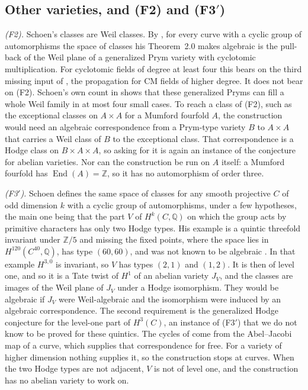 \documentclass[11pt]{amsart}
\theoremstyle{definition}
\theoremstyle{remark}
\newcommand{\QQ}{\mathbb{Q}}
\newcommand{\ZZ}{\mathbb{Z}}
\newcommand{\End}{\operatorname{End}}
\begin{document}
\subsection{Other varieties, and \texorpdfstring{(F2) and (F3$'$)}{(F2) and (F3')}}

\emph{(F2).} Schoen's classes are Weil classes. By \cite[Lemma~1.2 and
Remark~1.4]{Sch88}, for every curve with a cyclic group of automorphisms the
space of classes his Theorem~2.0 makes algebraic is the pull-back of the Weil
plane of a generalized Prym variety with cyclotomic multiplication. For
cyclotomic fields of degree at least four this bears on the third missing
input of \cite{BhH8}, the propagation for CM fields of higher degree. It
does not bear on (F2). Schoen's own count in \cite[Section~3]{Sch88} shows
that these generalized Pryms can fill a whole Weil family in at most four
small cases. To reach a class of (F2), such as the exceptional classes on $A\times A$
for a Mumford fourfold $A$, the construction would need an algebraic
correspondence from a Prym-type variety $B$ to $A\times A$ that carries a Weil
class of $B$ to the exceptional class. That correspondence is a Hodge class on
$B\times A\times A$, so asking for it is again an instance of the conjecture
for abelian varieties. Nor can the construction be run on $A$ itself: a
Mumford fourfold has $\End(A)=\ZZ$, so it has no automorphism of order
three.

\emph{(F3$'$).} Schoen defines the same space of classes for any smooth
projective $C$ of odd dimension $k$ with a cyclic group of automorphisms,
under a few hypotheses, the main one being that the part $V$ of
$H^{k}(C,\QQ)$ on which the group acts by primitive characters has only two
Hodge types. His example is a quintic threefold
invariant under $\ZZ/5$ and missing the fixed points, where the space lies in
$H^{120}(C^{40},\QQ)$, has type $(60,60)$, and was not known to be algebraic
\cite[Section~1]{Sch88}. In that example $H^{3,0}$ is invariant, so $V$ has
types $(2,1)$ and $(1,2)$. It is then of level one, and so it is a Tate
twist of $H^{1}$ of an abelian variety $J_{V}$, and the classes are images of
the Weil plane of $J_{V}$ under a Hodge isomorphism. They would be algebraic
if $J_{V}$ were Weil-algebraic and the isomorphism were induced by an
algebraic correspondence. The second requirement is the generalized Hodge
conjecture for the level-one part of $H^{3}(C)$, an instance of (F3$'$) that
we do not know to be proved for these quintics. The cycles of \cite[Section~2]{Sch88} come from
the Abel--Jacobi map of a curve, which supplies that correspondence for free.
For a variety of higher dimension nothing supplies it, so the construction
stops at curves. When the two Hodge types are not adjacent, $V$ is not of
level one, and the construction has no abelian variety to work on.
\end{document}
